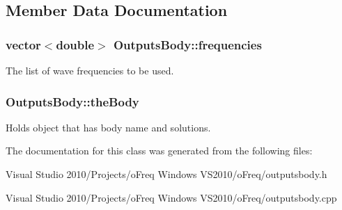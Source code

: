 \subsection{Member Data Documentation}
\hypertarget{class_outputs_body_a625ad12a75ab02375ec369c47bfa4b52}{
\subsubsection[{frequencies}]{\setlength{\rightskip}{0pt plus 5cm}vector$<$double$>$ Outputs\-Body\-::frequencies}}\label{class_outputs_body_a625ad12a75ab02375ec369c47bfa4b52}
The list of wave frequencies to be used. \hypertarget{class_outputs_body_aa03c8f557f55a5e8b806f4fc62397198}{
\subsubsection[{the\-Body}]{ Outputs\-Body\-::the\-Body}}\label{class_outputs_body_aa03c8f557f55a5e8b806f4fc62397198}
Holds object that has body name and solutions. 

The documentation for this class was generated from the following files\-:\begin{DoxyCompactItemize}
\item 
Visual Studio 2010/\-Projects/o\-Freq Windows V\-S2010/o\-Freq/outputsbody.\-h\item 
Visual Studio 2010/\-Projects/o\-Freq Windows V\-S2010/o\-Freq/outputsbody.\-cpp\end{DoxyCompactItemize}
